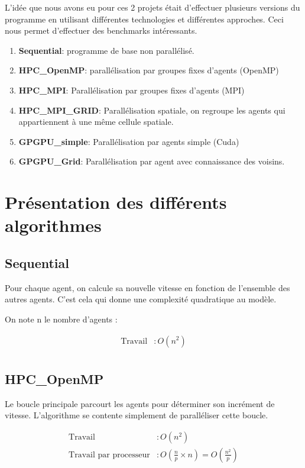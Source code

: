 \documentclass[liens,entete-ensimag,margeCorrection]{ensirapport}
\begin{document}
L'idée que nous avons eu pour ces 2 projets était d'effectuer plusieurs versions du programme en utilisant différentes technologies et différentes approches.
Ceci nous permet d'effectuer des benchmarks intéressants.

\begin{enumerate}
    \item \textbf{Sequential}: programme de base non parallélisé.
    \item \textbf{HPC\_OpenMP}: parallélisation par groupes fixes d'agents (OpenMP)
    \item \textbf{HPC\_MPI}: Parallélisation par groupes fixes d'agents (MPI)
    \item \textbf{HPC\_MPI\_GRID}: Parallélisation spatiale, on regroupe les agents qui appartiennent à une même cellule spatiale.
    \item \textbf{GPGPU\_simple}: Parallélisation par agents simple (Cuda)
    \item \textbf{GPGPU\_Grid}: Parallélisation par agent avec connaissance des voisins.

\end{enumerate}


\section{Présentation des différents algorithmes}
\subsection{Sequential}

Pour chaque agent, on calcule sa nouvelle vitesse en fonction de l'ensemble des autres agents.
C'est cela qui donne une complexité quadratique au modèle. 


On note n le nombre d'agents :

\begin{align*}
    \text{Travail} &: O\left( n^2 \right)  \\
\end{align*}

\subsection{HPC\_OpenMP}
Le boucle principale parcourt les agents pour déterminer son incrément de vitesse.
L'algorithme se contente simplement de paralléliser cette boucle.

\begin{align*}
    \text{Travail} &: O\left( n^2 \right)  \\
    \text{Travail par processeur} &: O\left( \frac np \times n \right)  = O\left( \frac {n^2}p \right) \\
\end{align*}
\end{document}
